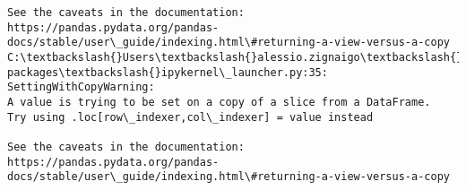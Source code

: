 \documentclass[11pt]{article}
\makeatletter
\newcommand{\boxspacing}{\kern\kvtcb@left@rule\kern\kvtcb@boxsep}
\newcommand{\prompt}[4]{
        \ttfamily\llap{{\color{#2}[#3]:\hspace{3pt}#4}}\vspace{-\baselineskip}
    }
\makeatother
\begin{document}
\begin{Verbatim}[commandchars=\\\{\}]
See the caveats in the documentation: https://pandas.pydata.org/pandas-
docs/stable/user\_guide/indexing.html\#returning-a-view-versus-a-copy
C:\textbackslash{}Users\textbackslash{}alessio.zignaigo\textbackslash{}Anaconda3\textbackslash{}lib\textbackslash{}site-packages\textbackslash{}ipykernel\_launcher.py:35:
SettingWithCopyWarning:
A value is trying to be set on a copy of a slice from a DataFrame.
Try using .loc[row\_indexer,col\_indexer] = value instead

See the caveats in the documentation: https://pandas.pydata.org/pandas-
docs/stable/user\_guide/indexing.html\#returning-a-view-versus-a-copy
    \end{Verbatim}

    \begin{tcolorbox}[breakable, size=fbox, boxrule=1pt, pad at break*=1mm,colback=cellbackground, colframe=cellborder]
\prompt{In}{incolor}{ }{\boxspacing}
\begin{Verbatim}[commandchars=\\\{\}]

\end{Verbatim}
\end{tcolorbox}
\end{document}
